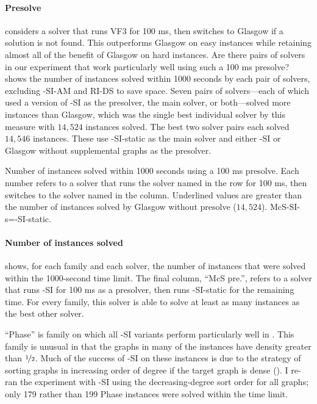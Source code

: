 \FloatBarrier

\paragraph*{Presolve} \cite{DBLP:conf/gbrpr/Solnon19} considers a solver that
runs VF3 for 100 ms, then switches to Glasgow if a solution is not found. This
outperforms Glasgow on easy instances while retaining almost all of the benefit
of Glasgow on hard instances.  Are there pairs of solvers in our experiment
that work particularly well using such a 100 ms presolve?
 shows the number of instances solved
within 1000 seconds by each pair of solvers, excluding \McSplit-SI-AM and RI-DS
to save space.  Seven pairs of solvers---each of which used a version of \McSplit-SI
as the presolver, the main solver, or both---solved more instances than Glasgow,
which was the single
best individual solver by this measure with $14,524$ instances solved.
The best two solver pairs
each solved $14,546$ instances.  These use \McSplit-SI-static as the main
solver and either \McSplit-SI or Glasgow without supplemental graphs as the
presolver.

\begin{table}[htb]
\centering
\footnotesize
    
\caption{Number of instances solved within 1000 seconds using a 100 ms presolve.  Each number
        refers to a solver that runs the solver named in the row for 100 ms, then switches to the
        solver named in the column.  Underlined values are greater than the number of instances
        solved by Glasgow without presolve ($14,524$). McS-SI-s=\McSplit-SI-static.}
\label{tab:si-decision-presolve-counts}
\end{table}

\paragraph*{Number of instances solved}
 shows, for each family and each solver,
the number of instances that were solved within the 1000-second time limit.
The final column, ``McS pre.'', refers to a solver that runs \McSplit-SI for 100 ms
as a presolver, then runs \McSplit-SI-static for the remaining time.  For every
family, this solver is able to solve at least as many instances as the best other
solver.

``Phase'' is family on which all \McSplit-SI variants perform particularly well in
.  This family is unusual in that the graphs
in many of the instances have density greater than $\nicefrac{1}{2}$.  
Much of the success of \McSplit-SI on these instances is due to the
strategy of sorting graphs in increasing order of degree if the target
graph is dense ().  I re-ran the experiment 
with \McSplit-SI using the decreasing-degree sort order for all graphs;
only 179 rather than 199 Phase instances were solved within the time limit.

